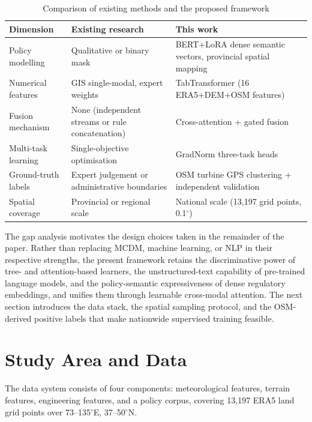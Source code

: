 \documentclass[12pt, a4paper]{article}
\begin{document}
\begin{table}[H]
\centering
\caption{Comparison of existing methods and the proposed framework}
\label{tab:gap}
\small
\begin{tabularx}{\textwidth}{lXX}
\toprule
\textbf{Dimension} & \textbf{Existing research} & \textbf{This work} \\
\midrule
Policy modelling & Qualitative or binary mask &
  BERT+LoRA dense semantic vectors, provincial spatial mapping \\
Numerical features & GIS single-modal, expert weights &
  TabTransformer 
  (16 ERA5+DEM+OSM features) \\
Fusion mechanism & None (independent streams or rule concatenation) &
  Cross-attention + gated fusion \\
Multi-task learning & Single-objective optimisation &
  GradNorm three-task heads \\
Ground-truth labels & Expert judgement or administrative boundaries &
  OSM turbine GPS clustering + independent validation \\
Spatial coverage & Provincial or regional scale &
  National scale (13,197 grid points, 0.1$^\circ$) \\
\bottomrule
\end{tabularx}
\end{table}

The gap analysis motivates the design choices taken in the
remainder of the paper. Rather than replacing MCDM, machine
learning, or NLP in their respective strengths, the present
framework retains the discriminative power of tree- and
attention-based learners, the unstructured-text capability of
pre-trained language models, and the policy-semantic
expressiveness of dense regulatory embeddings, and unifies
them through learnable cross-modal attention. The next section
introduces the data stack, the spatial sampling protocol, and
the OSM-derived positive labels that make nationwide supervised
training feasible.

\section{Study Area and Data}

The data system consists of four components: meteorological
features, terrain features, engineering features, and a policy
corpus, covering 13,197 ERA5 land grid points over
73--135$^\circ$E, 37--50$^\circ$N.
\end{document}
